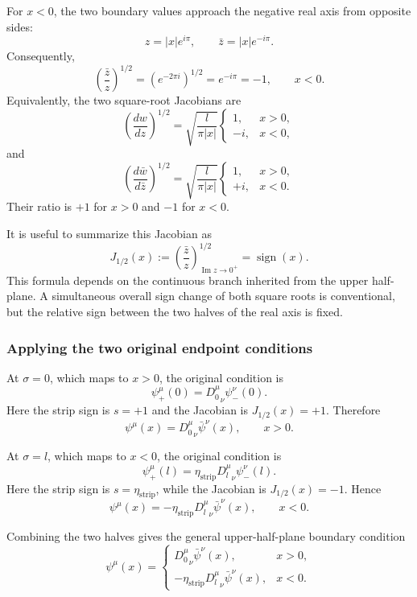 \documentclass[
  10pt,
  a4paper,
  openany]{book}
\begin{document}
For \(x<0\), the two boundary values approach the negative real axis
from opposite sides: \[
z=|x|e^{i\pi},
\qquad
\bar z=|x|e^{-i\pi}.
\] Consequently, \[
\left(\frac{\bar z}{z}\right)^{1/2}
=
\left(e^{-2\pi i}\right)^{1/2}
=e^{-i\pi}
=-1,
\qquad x<0.
\] Equivalently, the two square-root Jacobians are \[
\left(\frac{dw}{dz}\right)^{1/2}
=
\sqrt{\frac{l}{\pi|x|}}
\begin{cases}
1,&x>0,\\
-i,&x<0,
\end{cases}
\] and \[
\left(\frac{d\bar w}{d\bar z}\right)^{1/2}
=
\sqrt{\frac{l}{\pi|x|}}
\begin{cases}
1,&x>0,\\
+i,&x<0.
\end{cases}
\] Their ratio is \(+1\) for \(x>0\) and \(-1\) for \(x<0\).

It is useful to summarize this Jacobian as \[
J_{1/2}(x)
:=
\left(\frac{\bar z}{z}\right)^{1/2}_{\operatorname{Im}z\to0^+}
=
\operatorname{sign}(x).
\] This formula depends on the continuous branch inherited from the
upper half-plane. A simultaneous overall sign change of both square
roots is conventional, but the relative sign between the two halves of
the real axis is fixed.

\subsubsection{Applying the two original endpoint
conditions}\label{applying-the-two-original-endpoint-conditions}

At \(\sigma=0\), which maps to \(x>0\), the original condition is \[
\psi_+^\mu(0)
={D_0^\mu}_{\nu}\psi_-^\nu(0).
\] Here the strip sign is \(s=+1\) and the Jacobian is
\(J_{1/2}(x)=+1\). Therefore \[
\psi^\mu(x)
={D_0^\mu}_{\nu}\bar\psi^\nu(x),
\qquad x>0.
\]

At \(\sigma=l\), which maps to \(x<0\), the original condition is \[
\psi_+^\mu(l)
=\eta_{\mathrm{strip}}{D_l^\mu}_{\nu}\psi_-^\nu(l).
\] Here the strip sign is \(s=\eta_{\mathrm{strip}}\), while the
Jacobian is \(J_{1/2}(x)=-1\). Hence \[
\psi^\mu(x)
=-\eta_{\mathrm{strip}}{D_l^\mu}_{\nu}\bar\psi^\nu(x),
\qquad x<0.
\]

Combining the two halves gives the general upper-half-plane boundary
condition \[
\boxed{
\psi^\mu(x)
=
\begin{cases}
{D_0^\mu}_{\nu}\bar\psi^\nu(x),&x>0,\\[2mm]
-\eta_{\mathrm{strip}}{D_l^\mu}_{\nu}\bar\psi^\nu(x),&x<0.
\end{cases}
}
\]
\end{document}
